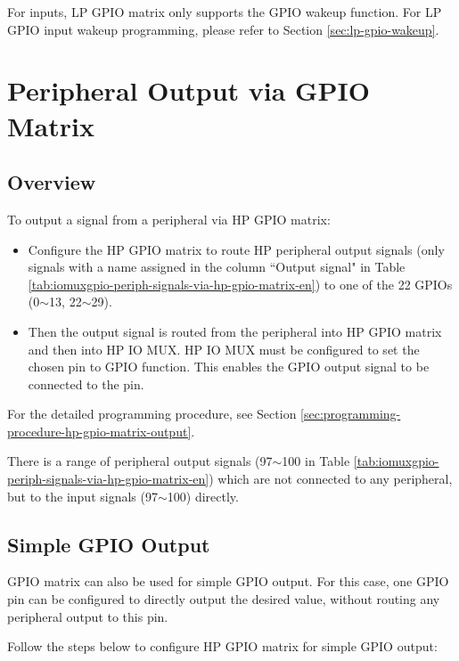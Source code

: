 \documentclass[main\_\_EN.tex]{subfiles}
\begin{document}
For inputs, LP GPIO matrix only supports the GPIO wakeup function. For LP GPIO input wakeup programming, please refer to Section \ref{sec:lp-gpio-wakeup}.


\section{Peripheral Output via GPIO Matrix}
\label{sec:peripheral-output-via-gpio-matrix}

\subsection{Overview}

To output a signal from a peripheral via HP GPIO matrix:
\begin{itemize}
    \item Configure the HP GPIO matrix to route HP peripheral output signals (only signals with a name assigned in the column ``Output signal" in Table \ref{tab:iomuxgpio-periph-signals-via-hp-gpio-matrix-en}) to one of the 22 GPIOs (0$\sim$13, 22$\sim$29).
    \item Then the output signal is routed from the peripheral into HP GPIO matrix and then into HP IO MUX. HP IO MUX must be configured to set the chosen pin to GPIO function. This enables the GPIO output signal to be connected to the pin.
\end{itemize}

For the detailed programming procedure, see Section \ref{sec:programming-procedure-hp-gpio-matrix-output}.

\begin{tiplisting}
There is a range of peripheral output signals (97$\sim$100 in Table \ref{tab:iomuxgpio-periph-signals-via-hp-gpio-matrix-en}) which are not connected to any peripheral, but to the input signals (97$\sim$100) directly.
\end{tiplisting}
\vspace{-2em}


\subsection{Simple GPIO Output}\label{sec:simple-gpio-output}

GPIO matrix can also be used for simple GPIO output. For this case, one GPIO pin can be configured to directly output the desired value, without routing any peripheral output to this pin.

Follow the steps below to configure HP GPIO matrix for simple GPIO output:
\end{document}
